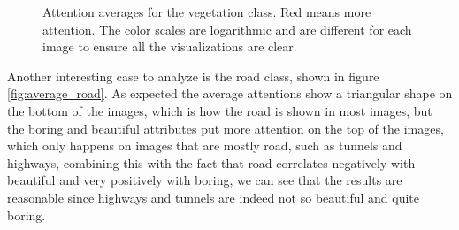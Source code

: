 \begin{figure}[ht]
{	}
	\caption[Vegetation attention averages]{
		Attention averages for the vegetation class. Red means more attention. The color
		scales are logarithmic and are different for each image to ensure all the visualizations
		are clear.
		}
\label{fig:average_vegetations}
\end{figure}

Another interesting case to analyze is the road class, shown in figure \ref{fig:average_road}.
As expected the average attentions show a triangular shape on the bottom of the images, which
is how the road is shown in most images, but the boring and beautiful attributes put more attention
on the top of the images, which only happens on images that are mostly road, such as tunnels and
highways, combining this with the fact that road correlates negatively with beautiful and very
positively with boring, we can see that the results are reasonable since highways and tunnels are
indeed not so beautiful and quite boring.

